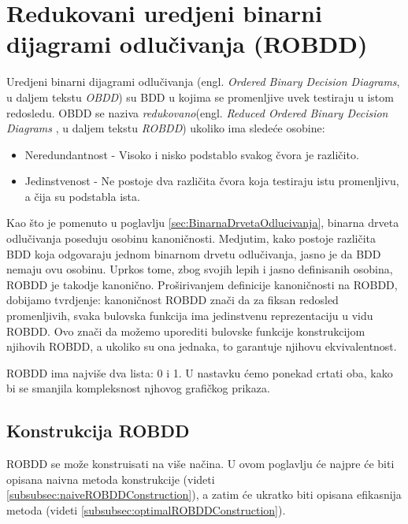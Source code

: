 \section{Redukovani uredjeni binarni dijagrami odlu\v{c}ivanja (ROBDD)}
\label{sec:OBDD}

Uredjeni binarni dijagrami odlu\v{c}ivanja (engl. \emph{Ordered Binary Decision Diagrams}, u daljem tekstu \emph{OBDD}) su BDD u kojima se promenljive uvek testiraju u istom redosledu. OBDD se naziva \emph{redukovano}(engl. \emph{Reduced Ordered Binary Decision Diagrams} \cite{ROBDD}, u daljem tekstu \emph{ROBDD}) ukoliko ima slede\'c{}e osobine:
\begin{itemize}
    \item Neredundantnost - Visoko i nisko podstablo svakog \v{c}vora je razli\v{c}ito.
    \item Jedinstvenost - Ne postoje dva razli\v{c}ita \v{c}vora koja testiraju istu promenljivu, a \v{c}ija su podstabla ista.
\end{itemize}

Kao \v{s}to je pomenuto u poglavlju \ref{sec:BinarnaDrvetaOdlucivanja}, binarna drveta odlu\v{c}ivanja poseduju osobinu kanoni\v{c}nosti. Medjutim, kako postoje razli\v{c}ita BDD koja odgovaraju jednom binarnom drvetu odlu\v{c}ivanja, jasno je da BDD nemaju ovu osobinu. Uprkos tome, zbog svojih lepih i jasno definisanih osobina, ROBDD je takodje kanoni\v{c}no. Pro\v{s}irivanjem definicije kanoni\v{c}nosti na ROBDD, dobijamo tvrdjenje: kanoni\v{c}nost ROBDD zna\v{c}i da za fiksan redosled promenljivih, svaka bulovska funkcija ima jedinstvenu reprezentaciju u vidu ROBDD. Ovo zna\v{c}i da mo\v{z}emo uporediti bulovske funkcije konstrukcijom njihovih ROBDD, a ukoliko su ona jednaka, to garantuje njihovu ekvivalentnost.

ROBDD ima najvi\v{s}e dva lista: 0 i 1. U nastavku \'c{}emo ponekad crtati oba, kako bi se smanjila kompleksnost njhovog grafi\v{c}kog prikaza.



\subsection{Konstrukcija ROBDD}
\label{subsec:ROBDDConstruction}

ROBDD se mo\v{z}e konstruisati na vi\v{s}e na\v{c}ina. U ovom poglavlju \'c{}e najpre \'c{}e biti opisana naivna metoda konstrukcije (videti \ref{subsubsec:naiveROBDDConstruction}), a zatim \'c{}e ukratko biti opisana efikasnija metoda (videti \ref{subsubsec:optimalROBDDConstruction}).



